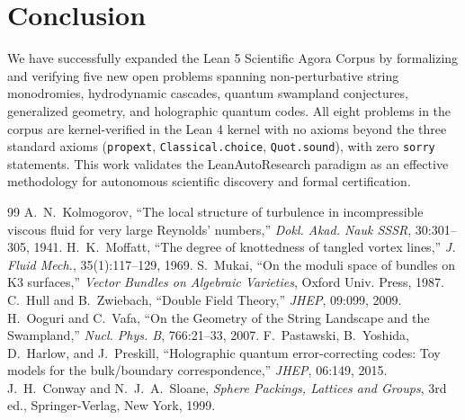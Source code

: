 \documentclass[11pt,a4paper]{article}
\begin{document}
\section{Conclusion}
We have successfully expanded the Lean 5 Scientific Agora Corpus by formalizing and verifying five new open problems spanning non-perturbative string monodromies, hydrodynamic cascades, quantum swampland conjectures, generalized geometry, and holographic quantum codes. All eight problems in the corpus are kernel-verified in the Lean 4 kernel with no axioms beyond the three standard axioms (\texttt{propext}, \texttt{Classical.choice}, \texttt{Quot.sound}), with zero \texttt{sorry} statements. This work validates the LeanAutoResearch paradigm as an effective methodology for autonomous scientific discovery and formal certification.

\begin{thebibliography}{99}
 A.~N.~Kolmogorov, ``The local structure of turbulence in incompressible viscous fluid for very large Reynolds' numbers,'' \textit{Dokl. Akad. Nauk SSSR}, 30:301--305, 1941.
 H.~K.~Moffatt, ``The degree of knottedness of tangled vortex lines,'' \textit{J. Fluid Mech.}, 35(1):117--129, 1969.
 S.~Mukai, ``On the moduli space of bundles on K3 surfaces,'' \textit{Vector Bundles on Algebraic Varieties}, Oxford Univ. Press, 1987.
 C.~Hull and B.~Zwiebach, ``Double Field Theory,'' \textit{JHEP}, 09:099, 2009.
 H.~Ooguri and C.~Vafa, ``On the Geometry of the String Landscape and the Swampland,'' \textit{Nucl. Phys. B}, 766:21--33, 2007.
 F.~Pastawski, B.~Yoshida, D.~Harlow, and J.~Preskill, ``Holographic quantum error-correcting codes: Toy models for the bulk/boundary correspondence,'' \textit{JHEP}, 06:149, 2015.
 J.~H.~Conway and N.~J.~A.~Sloane, \textit{Sphere Packings, Lattices and Groups}, 3rd ed., Springer-Verlag, New York, 1999.
\end{thebibliography}
\end{document}
